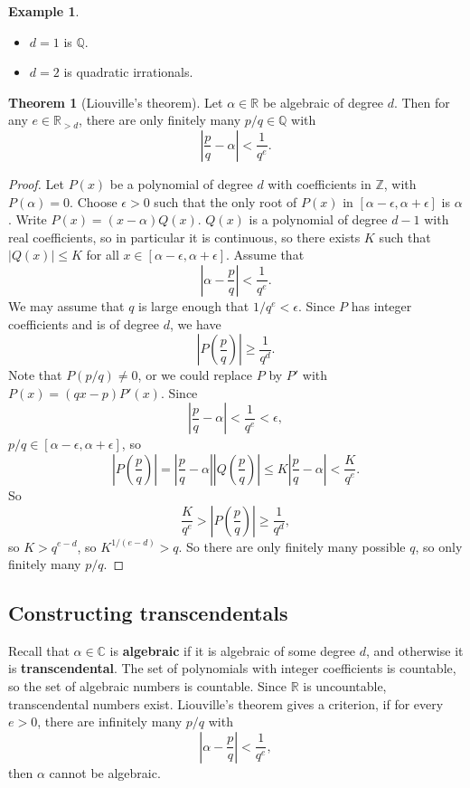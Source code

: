 \documentclass{article}
\newcommand{\Z}{\mathbb{Z}}
\newcommand{\Q}{\mathbb{Q}}
\newcommand{\R}{\mathbb{R}}
\newcommand{\C}{\mathbb{C}}
\newcommand{\rb}[1]{\left( #1 \right)}
\renewcommand{\sb}[1]{\left[ #1 \right]}
\newcommand{\abs}[1]{\left\lvert #1 \right\rvert}
\theoremstyle{definition}\newtheorem{definition}{Definition}
\theoremstyle{definition}\newtheorem{remark}[definition]{Remark}
\theoremstyle{definition}\newtheorem*{example}{Example}
\theoremstyle{definition}\newtheorem*{note}{Note}
\newtheorem{theorem}[definition]{Theorem}
\begin{document}
\begin{example}
\hfill
\begin{itemize}
\item $ d = 1 $ is $ \Q $.
\item $ d = 2 $ is quadratic irrationals.
\end{itemize}
\end{example}

\begin{theorem}[Liouville's theorem]
Let $ \alpha \in \R $ be algebraic of degree $ d $. Then for any $ e \in \R_{> d} $, there are only finitely many $ p / q \in \Q $ with
$$ \abs{\dfrac{p}{q} - \alpha} < \dfrac{1}{q^e}. $$
\end{theorem}

\begin{proof}
Let $ P\rb{x} $ be a polynomial of degree $ d $ with coefficients in $ \Z $, with $ P\rb{\alpha} = 0 $. Choose $ \epsilon > 0 $ such that the only root of $ P\rb{x} $ in $ \sb{\alpha - \epsilon, \alpha + \epsilon} $ is $ \alpha $. Write $ P\rb{x} = \rb{x - \alpha}Q\rb{x} $. $ Q\rb{x} $ is a polynomial of degree $ d - 1 $ with real coefficients, so in particular it is continuous, so there exists $ K $ such that $ \abs{Q\rb{x}} \le K $ for all $ x \in \sb{\alpha - \epsilon, \alpha + \epsilon} $. Assume that
$$ \abs{\alpha - \dfrac{p}{q}} < \dfrac{1}{q^e}. $$
We may assume that $ q $ is large enough that $ 1 / q^e < \epsilon $. Since $ P $ has integer coefficients and is of degree $ d $, we have
$$ \abs{P\rb{\dfrac{p}{q}}} \ge \dfrac{1}{q^d}. $$
Note that $ P\rb{p / q} \ne 0 $, or we could replace $ P $ by $ P' $ with $ P\rb{x} = \rb{qx - p}P'\rb{x} $. Since
$$ \abs{\dfrac{p}{q} - \alpha} < \dfrac{1}{q^e} < \epsilon, $$
$ p / q \in \sb{\alpha - \epsilon, \alpha + \epsilon} $, so
$$ \abs{P\rb{\dfrac{p}{q}}} = \abs{\dfrac{p}{q} - \alpha} \abs{Q\rb{\dfrac{p}{q}}} \le K \abs{\dfrac{p}{q} - \alpha} < \dfrac{K}{q^e}. $$
So
$$ \dfrac{K}{q^e} > \abs{P\rb{\dfrac{p}{q}}} \ge \dfrac{1}{q^d}, $$
so $ K > q^{e - d} $, so $ K^{1 / \rb{e - d}} > q $. So there are only finitely many possible $ q $, so only finitely many $ p / q $.
\end{proof}

\subsection{Constructing transcendentals}

Recall that $ \alpha \in \C $ is \textbf{algebraic} if it is algebraic of some degree $ d $, and otherwise it is \textbf{transcendental}. The set of polynomials with integer coefficients is countable, so the set of algebraic numbers is countable. Since $ \R $ is uncountable, transcendental numbers exist. Liouville's theorem gives a criterion, if for every $ e > 0 $, there are infinitely many $ p / q $ with
$$ \abs{\alpha - \dfrac{p}{q}} < \dfrac{1}{q^e}, $$
then $ \alpha $ cannot be algebraic.
\end{document}
